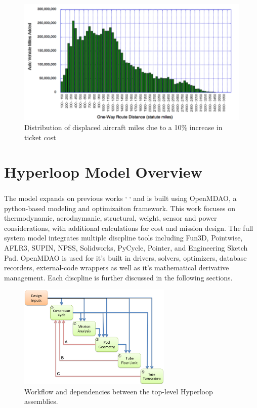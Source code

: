 \documentclass[heading.tex]{subfiles}
\begin{document}
\begin{figure}[hbtp]
\centering
\includegraphics[width=.75\textwidth]{images/price.png}
 \caption[price]{Distribution of displaced aircraft miles due to a 10\% increase in ticket cost}
\label{f:price}
\end{figure}


\section{Hyperloop Model Overview}

The model expands on previous works \cite{Chin} \textsuperscript{,}
\cite{goodwin2009cantera}\textsuperscript{,} \cite{GrayBenchmarking2013}
and is built using OpenMDAO, a python-based modeling and optimizaiton framework.
This work focuses on thermodynamic, aerodnymanic, structural,
weight, sensor and power considerations, with additional calculations for cost
and mission design. The full system model integrates multiple discpline tools
including Fun3D, Pointwise, AFLR3, SUPIN, NPSS, Solidworks, PyCycle, Pointer,
and Engineering Sketch Pad. OpenMDAO is used for it's built in drivers, solvers,
optimizers, database recorders, external-code wrappers as well as it's
mathematical derivative management. Each discpline is further discussed in the
following sections.



\label{s:struct}

\begin{figure}[hbtp]
\centering
\includegraphics[width=0.65\textwidth]{images/TopAssembly.png}
\caption{Workflow and dependencies between the top-level Hyperloop assemblies.}
\label{f:hyperloopXDSM}
\end{figure}
\end{document}
